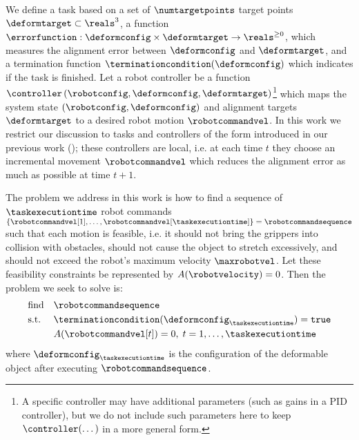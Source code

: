 We define a task based on a set of $\numtargetpoints$ target points $\deformtarget \subset \reals^3$, a function $\errorfunction: \deformconfig \times \deformtarget \rightarrow \reals^{\geq 0}$, which measures the alignment error between $\deformconfig$ and $\deformtarget$, and a termination function $\terminationcondition (\deformconfig)$ which indicates if the task is finished. Let a robot controller be a function $\controller \left(\robotconfig, \deformconfig, \deformtarget \right)$\footnote{A specific controller may have additional parameters (such as gains in a PID controller), but we do not include such parameters here to keep $\controller(\dots)$ in a more general form.} which maps the system state $\left( \robotconfig, \deformconfig \right)$ and alignment targets $\deformtarget$ to a desired robot motion $\robotcommandvel$. In this work we restrict our discussion to tasks and controllers of the form introduced in our previous work (\cite{Berenson2013,McConachie2018}); these controllers are local, i.e. at each time $t$ they choose an incremental movement $\robotcommandvel$ which reduces the alignment error as much as possible at time $t + 1$. 








The problem we address in this work is how to find a sequence of $\taskexecutiontime$ robot commands $\{ \robotcommandvel[1], \dots, \robotcommandvel[\taskexecutiontime] \} = \robotcommandsequence$ such that each motion is feasible, i.e. it should not bring the grippers into collision with obstacles, should not cause the object to stretch excessively, and should not exceed the robot's maximum velocity $\maxrobotvel$. Let these feasibility constraints be represented by $A(\robotvelocity) = 0$. Then the problem we seek to solve is:
\begin{equation}
    \begin{aligned}
        & \text{find}   & & \robotcommandsequence \\
        & \text{s.t.}   & & \terminationcondition(\deformconfig_{\taskexecutiontime}) = \texttt{true} \\
        &               & & A(\robotcommandvel[t])                                    = 0, \; t = 1, \dots, \taskexecutiontime
    \end{aligned}
    \label{eqn:main_problem_statement}
\end{equation}
where $\deformconfig_{\taskexecutiontime}$ is the configuration of the deformable object after executing $\robotcommandsequence$.

